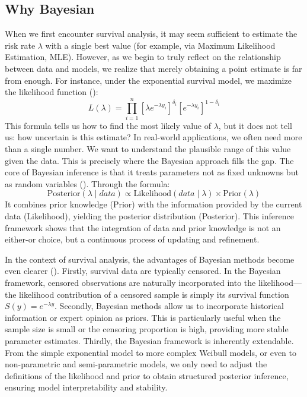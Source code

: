 \subsection{Why Bayesian}\label{Why Bayesian}
When we first encounter survival analysis, it may seem sufficient to estimate the risk rate $\lambda$ with a single best value (for example, via Maximum Likelihood Estimation, MLE). However, as we begin to truly reflect on the relationship between data and models, we realize that merely obtaining a point estimate is far from enough. For instance, under the exponential survival model, we maximize the likelihood function (\cite{ibrahim2013bayesian}):
$$
L(\lambda) = \prod_{i=1}^{n} [\lambda e^{-\lambda y_i}]^{\delta_i} [e^{-\lambda y_i}]^{1 - \delta_i}
$$
This formula tells us how to find the most likely value of $\lambda$, but it does not tell us: how uncertain is this estimate? In real-world applications, we often need more than a single number. We want to understand the plausible range of this value given the data. This is precisely where the Bayesian approach fills the gap. The core of Bayesian inference is that it treats parameters not as fixed unknowns but as random variables (\cite{bartovs2022informed}). Through the formula:
$$
\text{Posterior}(\lambda \mid data) \propto \text{Likelihood}(data \mid \lambda) \times \text{Prior}(\lambda)
$$
It combines prior knowledge (Prior) with the information provided by the current data (Likelihood), yielding the posterior distribution (Posterior). This inference framework shows that the integration of data and prior knowledge is not an either-or choice, but a continuous process of updating and refinement.

In the context of survival analysis, the advantages of Bayesian methods become even clearer (\cite{bartovs2022informed}). Firstly, survival data are typically censored. In the Bayesian framework, censored observations are naturally incorporated into the likelihood—the likelihood contribution of a censored sample is simply its survival function $S(y) = e^{-\lambda y}$. Secondly, Bayesian methods allow us to incorporate historical information or expert opinion as priors. This is particularly useful when the sample size is small or the censoring proportion is high, providing more stable parameter estimates. Thirdly, the Bayesian framework is inherently extendable. From the simple exponential model to more complex Weibull models, or even to non-parametric and semi-parametric models, we only need to adjust the definitions of the likelihood and prior to obtain structured posterior inference, ensuring model interpretability and stability.


